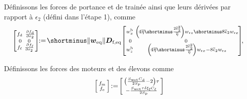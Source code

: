 \begin{algorithm}
\begin{algorithmic}[1]
\State Définissons les forces de portance et de trainée ainsi que leurs dérivées par rapport à $\epsilon_2$ (défini dans l'étape 1), comme
\begin{equation}
\label{eq:draglift_ALG}
\!\! \smallmat{\!f_{\text{d}} & \frac{\partial  f_{\text{d}}  }{\partial \epsilon_{2}} \!\! \\ 0 & 0  \\ \! f_{\ell} & \frac{\partial  f_{\ell} \!\! }{\partial \epsilon_{2}}} 
 \!\! := \! 
    \shortminus \| \boldsymbol{w}_{\mathrm{eq}} \|  \boldsymbol{D}_{\text{f,eq}}\! 
    \smallmat{\! w^{\text{b}}_{x} &  \left(\! 4 \overline{\eta}  \shortminus \frac{2\overline \epsilon_{2}^{2}}{\overline{\eta} } \! \right) w_{\text{r}z} \shortminus 8 \overline \epsilon_{2}  w_{\text{r}x} \!\! \\  0 & 0 \\  
   \! w^{\text{b}}_{z} &    \left(\! 4 \overline{\eta}  \shortminus \frac{2\overline \epsilon_{2}^{2}}{\overline{\eta} } \! \right) w_{\text{r}x} -8 \overline \epsilon_{2} w_{\text{r}z} \!\!
    }\!\!, 
\end{equation}

\State Définissons les forces des moteurs et des élevons comme
\begin{align}
\label{eq:motor_elevon_forces}
    \left[ \begin{smallmatrix} f_{\text{m}}  \\f_{\text{e}}  \end{smallmatrix} \right]\! := \!\left[ \begin{smallmatrix}\left(\frac{S_{\text{wet}}C_{\text{d}}}{2S_{\text{p}}}-2\right)\tau \\  - \frac{S_{\text{wet}}\tau \delta \xi_{\text{f}} C_{\ell}}{2S_{\text{p}}} \end{smallmatrix} \right]
\end{align}


\end{algorithmic}
\end{algorithm}
